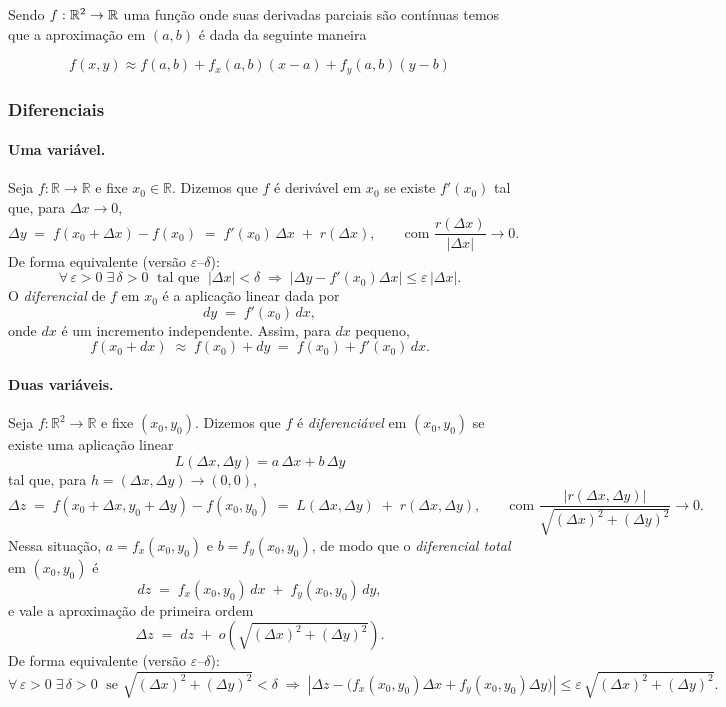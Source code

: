 \begin{definition} Sendo $f: \mathbb{R}^2 \rightarrow \mathbb{R}$ uma função onde suas derivadas parciais são contínuas temos que a aproximação em $(a, b)$ é dada da seguinte maneira 

\[
f(x, y) \approx f(a, b) + f_x(a, b)(x - a) + f_y(a, b)(y - b) 
\]

\end{definition}


\subsubsection{Diferenciais}

\paragraph{Uma variável.}
Seja $f:\mathbb{R}\to\mathbb{R}$ e fixe $x_0\in\mathbb{R}$. Dizemos que $f$ é derivável em $x_0$ se existe $f'(x_0)$ tal que, para $\Delta x\to 0$,
\[
\Delta y \;=\; f(x_0+\Delta x)-f(x_0) \;=\; f'(x_0)\,\Delta x \;+\; r(\Delta x),
\qquad \text{com } \frac{r(\Delta x)}{|\Delta x|}\longrightarrow 0.
\]
De forma equivalente (versão $\varepsilon$–$\delta$): 
\[
\forall\,\varepsilon>0\;\exists\,\delta>0\;\text{ tal que }\;|\Delta x|<\delta \;\Rightarrow\; 
\bigl|\Delta y - f'(x_0)\Delta x\bigr|\le \varepsilon\,|\Delta x|.
\]
O \emph{diferencial} de $f$ em $x_0$ é a aplicação linear dada por
\[
dy \;=\; f'(x_0)\,dx,
\]
onde $dx$ é um incremento independente. Assim, para $dx$ pequeno,
\[
f(x_0+dx) \;\approx\; f(x_0) + dy \;=\; f(x_0) + f'(x_0)\,dx.
\]

\paragraph{Duas variáveis.}
Seja $f:\mathbb{R}^2\to\mathbb{R}$ e fixe $(x_0,y_0)$. Dizemos que $f$ é \emph{diferenciável} em $(x_0,y_0)$ se existe uma aplicação linear 
\[
L(\Delta x,\Delta y)=a\,\Delta x + b\,\Delta y
\]
tal que, para $h=(\Delta x,\Delta y)\to(0,0)$,
\[
\Delta z \;=\; f(x_0+\Delta x,y_0+\Delta y) - f(x_0,y_0)
\;=\; L(\Delta x,\Delta y) \;+\; r(\Delta x,\Delta y),
\qquad \text{com } \frac{|r(\Delta x,\Delta y)|}{\sqrt{(\Delta x)^2+(\Delta y)^2}}\longrightarrow 0.
\]
Nessa situação, $a=f_x(x_0,y_0)$ e $b=f_y(x_0,y_0)$, de modo que o \emph{diferencial total} em $(x_0,y_0)$ é
\[
dz \;=\; f_x(x_0,y_0)\,dx \;+\; f_y(x_0,y_0)\,dy,
\]
e vale a aproximação de primeira ordem
\[
\Delta z \;=\; dz \;+\; o\!\left(\sqrt{(\Delta x)^2+(\Delta y)^2}\right).
\]
De forma equivalente (versão $\varepsilon$–$\delta$):
\[
\forall\,\varepsilon>0\;\exists\,\delta>0\;\text{ se }\sqrt{(\Delta x)^2+(\Delta y)^2}<\delta \;\Rightarrow\;
\left|\Delta z - \bigl(f_x(x_0,y_0)\Delta x + f_y(x_0,y_0)\Delta y\bigr)\right|
\le \varepsilon\,\sqrt{(\Delta x)^2+(\Delta y)^2}.
\]

